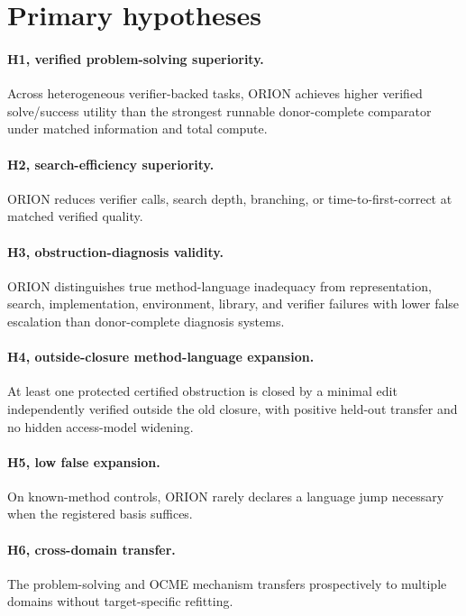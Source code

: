 \documentclass[11pt]{article}
\begin{document}
\section{Primary hypotheses}
\paragraph{H1, verified problem-solving superiority.}
Across heterogeneous verifier-backed tasks, ORION achieves higher verified solve/success utility than the strongest runnable donor-complete comparator under matched information and total compute.

\paragraph{H2, search-efficiency superiority.}
ORION reduces verifier calls, search depth, branching, or time-to-first-correct at matched verified quality.

\paragraph{H3, obstruction-diagnosis validity.}
ORION distinguishes true method-language inadequacy from representation, search, implementation, environment, library, and verifier failures with lower false escalation than donor-complete diagnosis systems.

\paragraph{H4, outside-closure method-language expansion.}
At least one protected certified obstruction is closed by a minimal edit independently verified outside the old closure, with positive held-out transfer and no hidden access-model widening.

\paragraph{H5, low false expansion.}
On known-method controls, ORION rarely declares a language jump necessary when the registered basis suffices.

\paragraph{H6, cross-domain transfer.}
The problem-solving and OCME mechanism transfers prospectively to multiple domains without target-specific refitting.
\end{document}
